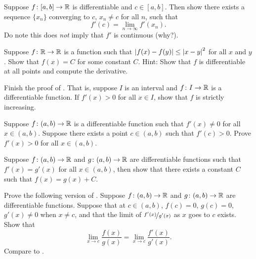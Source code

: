 \begin{exercise}
Suppose $f \colon [a,b] \to {\mathbb{R}}$ is differentiable and $c \in [a,b]$.
Then show there exists a sequence $\{ x_n \}$ converging to $c$, $x_n
\not= c$ for all $n$, such that
\begin{equation*}
f'(c) = \lim_{n\to \infty} f'(x_n).
\end{equation*}
Do note this does \emph{not} imply that $f'$ is continuous (why?).
\end{exercise}

\begin{exercise}
Suppose $f \colon {\mathbb{R}} \to {\mathbb{R}}$ is a function such that
$\left\lvert {f(x)-f(y)} \right\rvert \leq \left\lvert {x-y} \right\rvert^2$ for all $x$ and $y$.  Show that
$f(x) = C$ for some constant $C$.  Hint: Show that $f$ is differentiable
at all points and compute the derivative.
\end{exercise}

\begin{exercise} \label{exercise:posderincr}
Finish the proof of .  That is,
suppose $I$ is an interval and
$f \colon I \to {\mathbb{R}}$ is a differentiable function.
If $f'(x) > 0$ for all $x \in I$, show that $f$ is strictly increasing.
\end{exercise}

\begin{exercise}
Suppose $f \colon (a,b) \to {\mathbb{R}}$ is a differentiable function
such that
$f'(x) \not= 0$ for all $x \in (a,b)$.  Suppose there
exists
a point $c \in (a,b)$ such that $f'(c) > 0$.
Prove $f'(x) > 0$ for all $x \in (a,b)$.
\end{exercise}

\begin{exercise} \label{exercise:samediffconst}
Suppose $f \colon (a,b) \to {\mathbb{R}}$ and $g \colon (a,b) \to {\mathbb{R}}$ are
differentiable functions such that $f'(x) = g'(x)$ for all $x \in (a,b)$,
then show that there exists a constant $C$ such that $f(x) = g(x) + C$.
\end{exercise}

\begin{exercise}
Prove the following version of .
Suppose 
$f \colon (a,b) \to {\mathbb{R}}$ and $g \colon (a,b) \to {\mathbb{R}}$ are differentiable
functions.  Suppose that at $c \in (a,b)$, $f(c) = 0$, $g(c)=0$,
$g'(x) \not= 0$ when $x \not= c$, and
that the limit of $\nicefrac{f'(x)}{g'(x)}$ as $x$ goes to $c$ exists.  Show that
\begin{equation*}
\lim_{x \to c} \frac{f(x)}{g(x)} = 
\lim_{x \to c} \frac{f'(x)}{g'(x)} .
\end{equation*}
Compare to .
\end{exercise}


